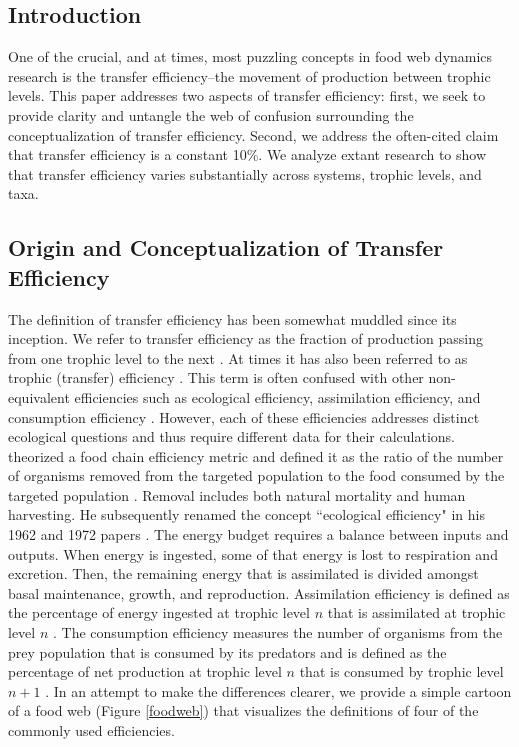 \documentclass[oneside,12pt,final]{sty/ucthesis-CA2012}
\let\cite\citep                             %
\begin{document}
\begin{mainmatter}
\section{Introduction}
One of the crucial, and at times, most puzzling concepts in food web dynamics research is the transfer efficiency--the movement of production between trophic levels. This paper addresses two aspects of transfer efficiency: first, we seek to provide clarity and untangle the web of confusion surrounding the conceptualization of transfer efficiency. Second, we address the often-cited claim that transfer efficiency is a constant 10\%. We analyze extant research to show that transfer efficiency varies substantially across systems, trophic levels, and taxa. 

\subsection{Origin and Conceptualization of Transfer Efficiency}
The definition of transfer efficiency has been somewhat muddled since its inception. We refer to transfer efficiency as the fraction of production passing from one trophic level to the next \cite{slobodkin1959energetics}. At times it has also been referred to as trophic (transfer) efficiency \cite{chapman1998ecology}. This term is often confused with other non-equivalent efficiencies such as ecological efficiency, assimilation efficiency, and consumption efficiency \cite{iverson1990control, hairston1993causeeffect}. However, each of these efficiencies addresses distinct ecological questions and thus require different data for their calculations. \citet{slobodkin1959energetics} theorized a food chain efficiency metric and defined it as the ratio of the number of organisms removed from the targeted population to the food consumed by the targeted population \cite{slobodkin1960ecological,slobodkin1962energy}. Removal includes both natural mortality and human harvesting. He subsequently renamed the concept ``ecological efficiency" in his 1962 and 1972 papers \cite{slobodkin1962energy, slobodkin1972inconstancy}. The energy budget requires a balance between inputs and outputs. When energy is ingested, some of that energy is lost to respiration and excretion. Then, the remaining energy that is assimilated is divided amongst basal maintenance, growth, and reproduction. Assimilation efficiency is defined as the percentage of energy ingested at trophic level $n$ that is assimilated at trophic level $n$ \cite{hairston1993causeeffect}. The consumption efficiency measures the number of organisms from the prey population that is consumed by its predators and is defined as the percentage of net production at trophic level $n$ that is consumed by trophic level $n + 1$ \cite{hairston1993causeeffect}. In an attempt to make the differences clearer, we provide a simple cartoon of a food web (Figure \ref{foodweb}) that visualizes the definitions of four of the commonly used efficiencies. 


\end{mainmatter}
\end{document}

